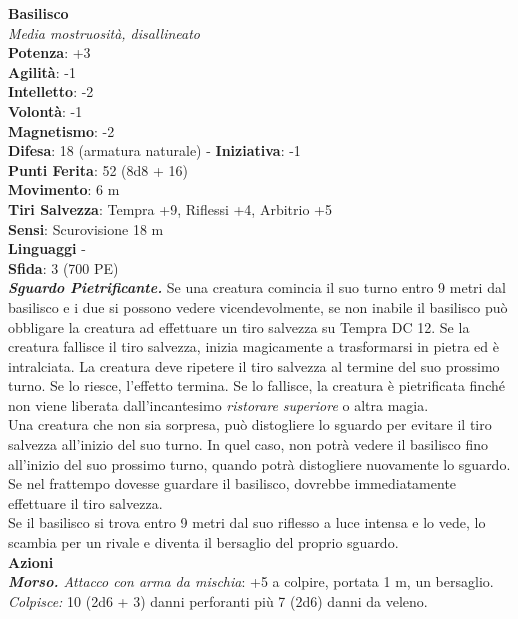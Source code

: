 \begin{multicols}{2}
\medskip\textbf{Basilisco}\\
\emph{Media mostruosità, disallineato}\\
\textbf{Potenza}: +3\\
\textbf{Agilità}: -1\\
\textbf{Intelletto}: -2\\
\textbf{Volontà}: -1\\
\textbf{Magnetismo}: -2\\
\textbf{Difesa}: 18 (armatura naturale) - \textbf{Iniziativa}: -1\\
\textbf{Punti Ferita}: 52 (8d8 + 16)\\
\textbf{Movimento}: 6 m\\
\textbf{Tiri Salvezza}: Tempra +9, Riflessi +4, Arbitrio +5\\
\textbf{Sensi}: Scurovisione 18 m\\
\textbf{Linguaggi} -\\
\textbf{Sfida}: 3 (700 PE)\smallskip\\
\emph{\textbf{Sguardo Pietrificante.}} Se una creatura comincia il suo turno entro 9 metri dal basilisco e i due si possono vedere vicendevolmente, se non inabile il basilisco può obbligare la creatura ad effettuare un tiro salvezza su Tempra DC 12. Se la creatura fallisce il tiro  salvezza, inizia magicamente a trasformarsi in pietra ed è   intralciata. La creatura deve ripetere il tiro salvezza al termine del   suo prossimo turno. Se lo riesce, l'effetto termina. Se lo fallisce,   la creatura è pietrificata finché non viene liberata dall'incantesimo  \emph{ristorare} \emph{superiore} o altra magia. \\
Una creatura che non sia sorpresa, può distogliere lo sguardo per evitare il tiro salvezza all'inizio del suo turno. In quel caso, non potrà vedere il basilisco fino all'inizio del suo prossimo turno, quando potrà distogliere nuovamente lo sguardo. Se nel frattempo dovesse guardare il basilisco, dovrebbe immediatamente effettuare il tiro salvezza.\\
Se il basilisco si trova entro 9 metri dal suo riflesso a luce intensa e lo vede, lo scambia per un rivale e diventa il bersaglio del proprio sguardo.\\
\smallskip\textbf{Azioni}\\
\emph{\textbf{Morso.} Attacco con arma da mischia}: +5 a colpire, portata 1 m, un bersaglio. \\
\emph{Colpisce:} 10 (2d6 + 3) danni perforanti più 7 (2d6) danni da veleno.\\

\end{multicols}
